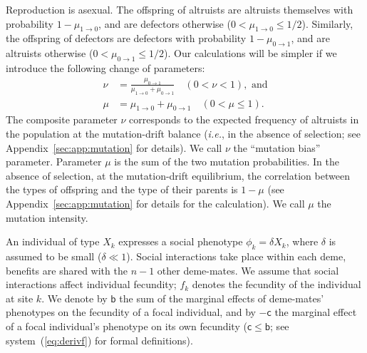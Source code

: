 \documentclass[11pt, letterpaper]{article}
\newcommand{\sysref}[1]{system~(\ref{#1})}
\newcommand{\ie}{\textit{i.e.}}
\newcommand{\bigO}[1]{O\left( #1 \right)}
\newcommand{\appname}[0]{Appendix}
\newcommand{\bb}{\mathsf{b}}
\newcommand{\cc}{\mathsf{c}}
\newcommand{\mutbias}{\nu}
\newcommand{\selstr}{\delta}
\begin{document}
Reproduction is asexual. The offspring of altruists are altruists themselves with probability $1-\mu_{1\to 0}$, and are defectors otherwise ($0<\mu_{1\to 0}\leq 1/2$). Similarly, the offspring of defectors are defectors with probability $1-\mu_{0\to 1}$, and are altruists otherwise ($0<\mu_{0\to 1}\leq 1/2$). Our calculations will be simpler if we introduce the following change of parameters:
\begin{subequations}\label{eq:changemut}
\begin{align}
\mutbias & = \frac{\mu_{0\to 1}}{\mu_{1\to 0} + \mu_{0\to 1}} \quad (0<\mutbias<1), \textrm{ and}\label{eq:nu}\\
\mu &= \mu_{1\to 0} + \mu_{0\to 1} \quad (0 < \mu \leq 1)\label{eq:mu}.
\end{align}
\end{subequations}
The composite parameter $\mutbias$ corresponds to the expected frequency of altruists in the population at the mutation-drift balance (\ie, in the absence of selection; see \appname~\ref{sec:app:mutation} for details). We call $\mutbias$ the ``mutation bias'' parameter. Parameter $\mu$ is the sum of the two mutation probabilities. In the absence of selection, at the mutation-drift equilibrium, the correlation between the types of offspring and the type of their parents is $1-\mu$ (see \appname~\ref{sec:app:mutation} for details for the calculation). We call $\mu$ the mutation intensity.%

An individual of type $X_k$ expresses a social phenotype $\phi_k = \selstr X_k$, where $\selstr$ is assumed to be small ($\selstr \ll 1$). Social interactions take place within each deme, benefits are shared with the $n-1$ other deme-mates. We assume that social interactions affect individual fecundity; $f_k$ denotes the fecundity of the individual at site $k$. We denote by $\bb$ the sum of the marginal effects of deme-mates' phenotypes on the fecundity of a focal individual, and by $-\cc$ the marginal effect of a focal individual's phenotype on its own fecundity ($\cc \leq \bb$; see \sysref{eq:derivf} for formal definitions). %
\end{document}
